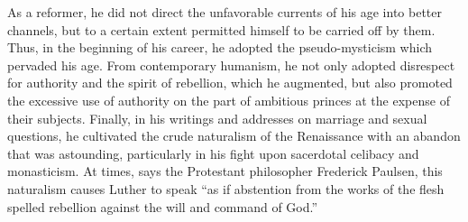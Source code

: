 As a reformer, he did not direct the unfavorable currents of his
age into better channels, but to a certain extent permitted himself to
be carried off by them. Thus, in the beginning of his career, he
adopted the pseudo-mysticism which pervaded his age. From contemporary
humanism, he not only adopted disrespect for authority
and the spirit of rebellion, which he augmented, but also promoted
the excessive use of authority on the part of ambitious princes at the
expense of their subjects. Finally, in his writings and addresses on
marriage and sexual questions, he cultivated the crude naturalism of
the Renaissance with an abandon that was astounding, particularly in
his fight upon sacerdotal celibacy and monasticism. At times, says the
Protestant philosopher Frederick Paulsen, this naturalism causes
Luther to speak “as if abstention from the works of the flesh spelled
rebellion against the will and command of God.”
